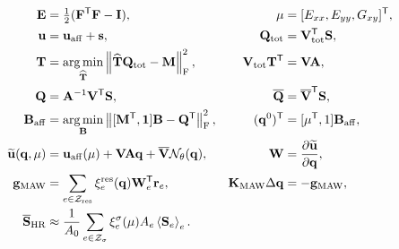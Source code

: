 \documentclass[11pt,a4paper]{article}
\newcommand{\transpose}{^{\mathsf T}}
\newcommand{\frobnorm}[1]{\left\lVert #1 \right\rVert_{\mathrm F}}
\newcommand{\avg}[1]{\left\langle #1 \right\rangle}
\newcommand{\vect}[1]{\mathbf{#1}}
\newcommand{\mat}[1]{\mathbf{#1}}
\newcommand{\set}[1]{\mathcal{#1}}
\begin{document}
\begin{align}
  \mat E &= \tfrac12(\mat F\transpose\mat F-\mat I),
  & \vect\mu&=[E_{xx},E_{yy},G_{xy}]\transpose,
  \\
  \vect u&=\vect u_{\rm aff}+\vect s,
  & \mat Q_{\rm tot}&=\mat V_{\rm tot}\transpose\mat S,
  \\
  \mat T&=\operatorname*{arg\,min}_{\widehat{\mat T}}
  \frobnorm{\widehat{\mat T}\mat Q_{\rm tot}-\mat M}^{2},
  & \mat V_{\rm tot}\mat T\transpose&=\mat V\mat A,
  \\
  \mat Q&=\mat A^{-1}\mat V\transpose\mat S,
  & \overline{\mat Q}&=\overline{\mat V}\transpose\mat S,
  \\
  \mat B_{\rm aff}&=\operatorname*{arg\,min}_{\mat B}
  \frobnorm{[\mat M\transpose,\vect1]\mat B-\mat Q\transpose}^{2},
  & (\vect q^0)\transpose&=[\vect\mu\transpose,1]\mat B_{\rm aff},
  \\
  \widetilde{\vect u}(\vect q,\vect\mu)
  &=\vect u_{\rm aff}(\vect\mu)+\mat V\mat A\vect q+
  \overline{\mat V}\mathcal N_\theta(\vect q),
  & \mat W&=\frac{\partial\widetilde{\vect u}}{\partial\vect q},
  \\
  \vect g_{\rm MAW}
  &=\sum_{e\in\set Z_{\rm res}}
  \xi_e^{\rm res}(\vect q)\mat W_e\transpose\vect r_e,
  & \mat K_{\rm MAW}\Delta\vect q&=-\vect g_{\rm MAW},
  \\
  \overline{\mat S}_{\rm HR}
  &\approx\frac{1}{A_0}\sum_{e\in\set Z_\sigma}
   \xi_e^\sigma(\vect\mu)A_e\avg{\mat S_e}_e.
\end{align}
\end{document}
